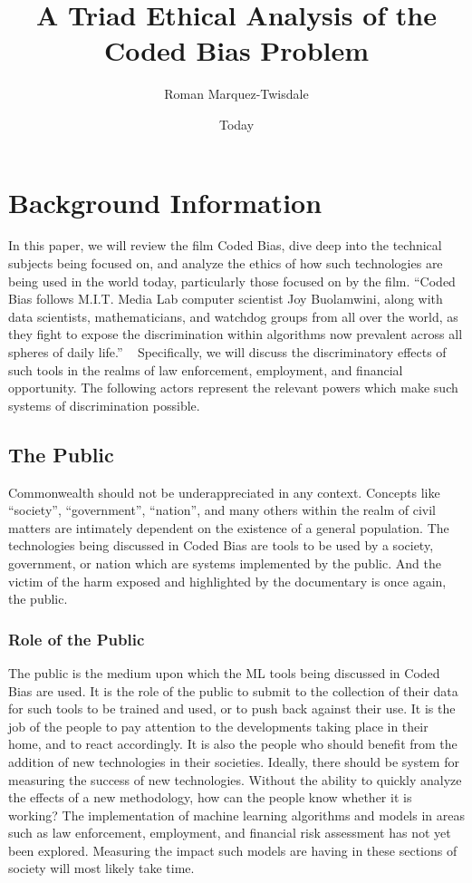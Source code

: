 \documentclass[sigconf, 10pt]{acmart}
\begin{document}
\title{A Triad Ethical Analysis of the Coded Bias Problem}
\author{Roman Marquez-Twisdale}

\date{Today}
\maketitle

\section{Background Information}
In this paper, we will review the film Coded Bias, dive deep into the technical subjects being focused on, and analyze the ethics of how such technologies are being used in the world today, particularly those focused on by the film. “Coded Bias follows M.I.T. Media Lab computer scientist Joy Buolamwini, along with data scientists, mathematicians, and watchdog groups from all over the world, as they fight to expose the discrimination within algorithms now prevalent across all spheres of daily life.” ~\cite{used_twelfth(11)} Specifically, we will discuss the discriminatory effects of such tools in the realms of law enforcement, employment, and financial opportunity. The following actors represent the relevant powers which make such systems of discrimination possible.
\subsection{The Public}
Commonwealth should not be underappreciated in any context. Concepts like “society”, “government”, “nation”, and many others within the realm of civil matters are intimately dependent on the existence of a general population. The technologies being discussed in Coded Bias are tools to be used by a society, government, or nation which are systems implemented by the public. And the victim of the harm exposed and highlighted by the documentary is once again, the public.
\subsubsection{Role of the Public}
The public is the medium upon which the ML tools being discussed in Coded Bias are used. It is the role of the public to submit to the collection of their data for such tools to be trained and used, or to push back against their use. It is the job of the people to pay attention to the developments taking place in their home, and to react accordingly. It is also the people who should benefit from the addition of new technologies in their societies. Ideally, there should be system for measuring the success of new technologies. Without the ability to quickly analyze the effects of a new methodology, how can the people know whether it is working? The implementation of machine learning algorithms and models in areas such as law enforcement, employment, and financial risk assessment has not yet been explored. Measuring the impact such models are having in these sections of society will most likely take time.
\end{document}
